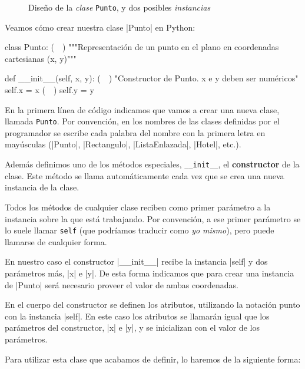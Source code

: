 \begin{figure}[htb]
\caption{Diseño de la \emph{clase} \texttt{Punto}, y dos posibles \emph{instancias}}
\label{fig-punto}
\end{figure}

Veamos cómo crear nuestra clase |Punto| en Python:

\begin{codigo-python-sn}
class Punto: (~~)
    """Representación de un punto en el plano en
       coordenadas cartesianas (x, y)"""

    def __init__(self, x, y): (~~)
        "Constructor de Punto. x e y deben ser numéricos"
        self.x = x (~~)
        self.y = y
\end{codigo-python-sn}

 En la primera línea de código indicamos que vamos a crear una nueva
clase, llamada \lstinline!Punto!.  Por convención, en los nombres de las clases
definidas por el programador se escribe cada palabra del nombre con la primera
letra en mayúsculas (|Punto|, |Rectangulo|, |ListaEnlazada|,
|Hotel|, etc.).

 Además definimos uno de los métodos especiales, \lstinline!__init__!, el
{\bf constructor} de la clase.  Este método se llama automáticamente cada
vez que se crea una nueva instancia de la clase.

Todos los métodos de cualquier clase reciben como
primer parámetro a la instancia sobre la que está trabajando.  Por
convención, a ese primer parámetro se lo suele llamar \lstinline!self! (que
podríamos traducir como \emph{yo mismo}), pero puede llamarse de cualquier
forma.

En nuestro caso el constructor |__init__| recibe la instancia |self| y dos
parámetros más, |x| e |y|. De esta forma indicamos que para crear una instancia
de |Punto| será necesario proveer el valor de ambas coordenadas.

 En el cuerpo del constructor se definen los atributos, utilizando la notación
punto con la instancia |self|. En este caso los atributos se llamarán igual que
los parámetros del constructor, |x| e |y|, y se inicializan con el valor de
los parámetros.

Para utilizar esta clase que acabamos de definir, lo haremos de la
siguiente forma:

